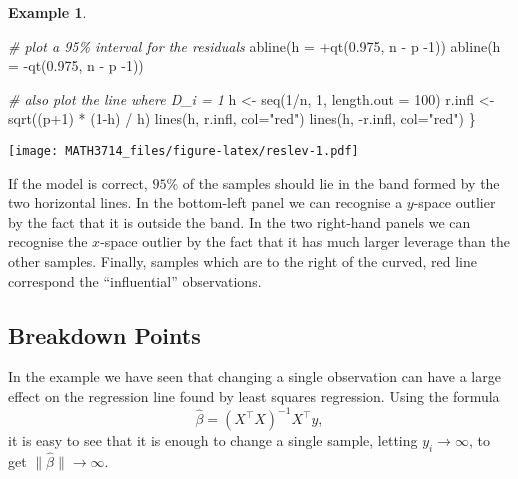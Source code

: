 \documentclass[
  a4paper,
]{article}
\newenvironment{Shaded}{\begin{snugshade}}{\end{snugshade}}
\newcommand{\AttributeTok}[1]{\textcolor[rgb]{0.77,0.63,0.00}{#1}}
\newcommand{\CommentTok}[1]{\textcolor[rgb]{0.56,0.35,0.01}{\textit{#1}}}
\newcommand{\DecValTok}[1]{\textcolor[rgb]{0.00,0.00,0.81}{#1}}
\newcommand{\FloatTok}[1]{\textcolor[rgb]{0.00,0.00,0.81}{#1}}
\newcommand{\FunctionTok}[1]{\textcolor[rgb]{0.00,0.00,0.00}{#1}}
\newcommand{\NormalTok}[1]{#1}
\newcommand{\OtherTok}[1]{\textcolor[rgb]{0.56,0.35,0.01}{#1}}
\newcommand{\SpecialCharTok}[1]{\textcolor[rgb]{0.00,0.00,0.00}{#1}}
\newcommand{\StringTok}[1]{\textcolor[rgb]{0.31,0.60,0.02}{#1}}
\theoremstyle{definition}
\theoremstyle{definition}
\newtheorem{example}{Example}[section]
\theoremstyle{definition}
\theoremstyle{definition}
\theoremstyle{remark}
\begin{document}
\begin{example}
\begin{Shaded}
\begin{Highlighting}[]
    \CommentTok{\# plot a 95\% interval for the residuals}
    \FunctionTok{abline}\NormalTok{(}\AttributeTok{h =} \SpecialCharTok{+}\FunctionTok{qt}\NormalTok{(}\FloatTok{0.975}\NormalTok{, n }\SpecialCharTok{{-}}\NormalTok{ p }\SpecialCharTok{{-}}\DecValTok{1}\NormalTok{))}
    \FunctionTok{abline}\NormalTok{(}\AttributeTok{h =} \SpecialCharTok{{-}}\FunctionTok{qt}\NormalTok{(}\FloatTok{0.975}\NormalTok{, n }\SpecialCharTok{{-}}\NormalTok{ p }\SpecialCharTok{{-}}\DecValTok{1}\NormalTok{))}

    \CommentTok{\# also plot the line where D\_i = 1}
\NormalTok{    h }\OtherTok{\textless{}{-}} \FunctionTok{seq}\NormalTok{(}\DecValTok{1}\SpecialCharTok{/}\NormalTok{n, }\DecValTok{1}\NormalTok{, }\AttributeTok{length.out =} \DecValTok{100}\NormalTok{)}
\NormalTok{    r.infl }\OtherTok{\textless{}{-}} \FunctionTok{sqrt}\NormalTok{((p}\SpecialCharTok{+}\DecValTok{1}\NormalTok{) }\SpecialCharTok{*}\NormalTok{ (}\DecValTok{1}\SpecialCharTok{{-}}\NormalTok{h) }\SpecialCharTok{/}\NormalTok{ h)}
    \FunctionTok{lines}\NormalTok{(h, r.infl, }\AttributeTok{col=}\StringTok{"red"}\NormalTok{)}
    \FunctionTok{lines}\NormalTok{(h, }\SpecialCharTok{{-}}\NormalTok{r.infl, }\AttributeTok{col=}\StringTok{"red"}\NormalTok{)}
\NormalTok{\}}
\end{Highlighting}
\end{Shaded}

\texttt{[image: MATH3714\_files/figure-latex/reslev-1.pdf]}

If the model is correct, \(95\%\) of the samples should lie in the
band formed by the two horizontal lines. In the bottom-left panel we can
recognise a \(y\)-space outlier by the fact that it is outside the band.
In the two right-hand panels we can recognise the \(x\)-space outlier
by the fact that it has much larger leverage than the other samples.
Finally, samples which are to the right of the curved, red line
correspond the ``influential'' observations.
\end{example}

\hypertarget{breakdown-points}{%
\subsection{Breakdown Points}\label{breakdown-points}}

In the example we have seen that changing a single observation can
have a large effect on the regression line found by least squares
regression. Using the formula
\begin{equation*}
  \hat\beta
  = (X^\top X)^{-1} X^\top y,
\end{equation*}
it is easy to see that it is enough to change a single sample,
letting \(y_i \to\infty\), to get \(\|\hat\beta\| \to \infty\).
\end{document}
